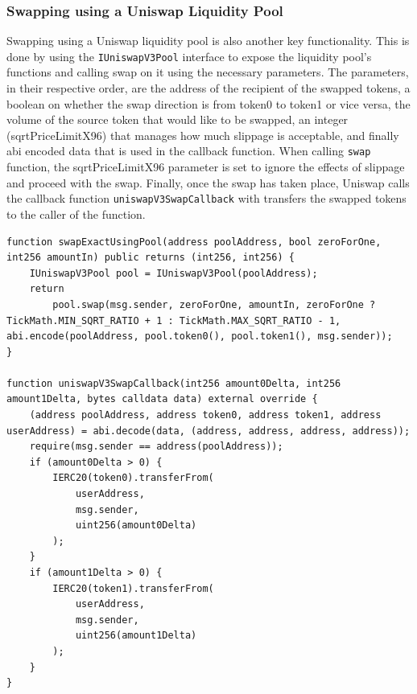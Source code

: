 \subsubsection{Swapping using a Uniswap Liquidity Pool}
Swapping using a Uniswap liquidity pool is also another key functionality. This is done by using the \texttt{IUniswapV3Pool} interface to expose the liquidity pool's functions and calling swap on it using the necessary parameters. The parameters, in their respective order, are the address of the recipient of the swapped tokens, a boolean on whether the swap direction is from token0 to token1 or vice versa, the volume of the source token that would like to be swapped, an integer (sqrtPriceLimitX96) that manages how much slippage is acceptable, and finally abi encoded data that is used in the callback function. When calling \texttt{swap} function, the sqrtPriceLimitX96 parameter is set to ignore the effects of slippage and proceed with the swap. Finally, once the swap has taken place, Uniswap calls the callback function \texttt{uniswapV3SwapCallback} with transfers the swapped tokens to the caller of the function.

\begin{lstlisting}[language=Solidity]
function swapExactUsingPool(address poolAddress, bool zeroForOne, int256 amountIn) public returns (int256, int256) {
    IUniswapV3Pool pool = IUniswapV3Pool(poolAddress);
    return
        pool.swap(msg.sender, zeroForOne, amountIn, zeroForOne ? TickMath.MIN_SQRT_RATIO + 1 : TickMath.MAX_SQRT_RATIO - 1, abi.encode(poolAddress, pool.token0(), pool.token1(), msg.sender));
}

function uniswapV3SwapCallback(int256 amount0Delta, int256 amount1Delta, bytes calldata data) external override {
    (address poolAddress, address token0, address token1, address userAddress) = abi.decode(data, (address, address, address, address));
    require(msg.sender == address(poolAddress));
    if (amount0Delta > 0) {
        IERC20(token0).transferFrom(
            userAddress,
            msg.sender,
            uint256(amount0Delta)
        );
    }
    if (amount1Delta > 0) {
        IERC20(token1).transferFrom(
            userAddress,
            msg.sender,
            uint256(amount1Delta)
        );
    }
}
\end{lstlisting}


